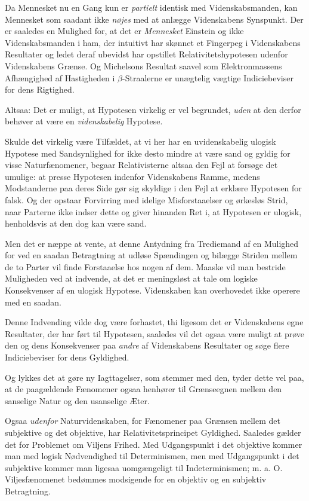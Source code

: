 \documentclass[12pt,a4paper]{article}
\newcommand{\opage}[1]{\marginnote{\footnotesize\textit{[#1]}}}
\begin{document}
Da Mennesket nu en Gang kun er \emph{partielt} identisk med
Videnskabsmanden, kan Mennesket som saadant ikke \emph{nøjes} med at
anlægge Videnskabens Synspunkt. Der er saaledes en Mulighed for, at det
er \emph{Mennesket} Einstein og ikke Videnskabsmanden i ham, der
intuitivt har skønnet et Fingerpeg i Videnskabens Resultater og ledet
deraf ubevidst har opstillet Relativitetshypotesen udenfor Videnskabens
Grænse. Og Michelsons Resultat saavel som Elektronmassens Afhængighed af
Hastigheden i $\beta$-Straalerne er unægtelig vægtige Indiciebeviser for
dens Rigtighed.

Altsaa: Det er muligt, at Hypotesen virkelig er vel begrundet,
\emph{uden} at den derfor behøver at være en \emph{videnskabelig}
Hypotese.

\bigskip

Skulde det virkelig være Tilfældet, at vi her har en uvidenskabelig
ulogisk Hypotese med Sandsynlighed for ikke desto mindre at være sand og
gyldig for visse Naturfænomener, begaar Relativisterne altsaa den Fejl at
forsøge det umulige: at presse Hypotesen indenfor Videnskabens Ramme,
medens Modstanderne paa deres Side gør sig skyldige i den Fejl at erklære
Hypotesen for falsk. Og der opstaar Forvirring med idelige
Misforstaaelser og ørkesløs Strid, naar Parterne ikke indser dette og
giver hinanden Ret i, at Hypotesen er ulogisk, henholdsvis at den dog kan
være sand.

\opage{17} Men det er næppe at vente, at denne Antydning fra Trediemand af en
Mulighed for ved en saadan Betragtning at udløse Spændingen og bilægge
Striden mellem de to Parter vil finde Forstaaelse hos nogen af dem.
Maaske vil man bestride Muligheden ved at indvende, at det er
meningsløst at tale om logiske Konsekvenser af en ulogisk Hypotese.
Videnskaben kan overhovedet ikke operere med en saadan.

Denne Indvending vilde dog være forhastet, thi ligesom det er
Videnskabens egne Resultater, der har ført til Hypotesen, saaledes vil
det ogsaa være muligt at prøve den og dens Konsekvenser paa \emph{andre}
af Videnskabens Resultater og søge flere Indiciebeviser for dens
Gyldighed.

Og lykkes det at gøre ny Iagttagelser, som stemmer med den, tyder dette
vel paa, at de paagældende Fænomener ogsaa henhører til Grænseegnen
mellem den sanselige Natur og den usanselige Æter.

\bigskip

Ogsaa \emph{udenfor} Naturvidenskaben, for Fænomener paa Grænsen mellem
det subjektive og det objektive, har Relativitetsprincipet Gyldighed.
Saaledes gælder det for Problemet om Viljens \guillemotright
Frihed\guillemotleft. Med Udgangspunkt i det objektive kommer man med
logisk Nødvendighed til Determinismen, men med Udgangspunkt i det
subjektive kommer man ligesaa uomgængeligt til Indeterminismen; m. a. O.
Viljesfænomenet bedømmes modsigende for en objektiv og en subjektiv
Betragtning.
\end{document}

